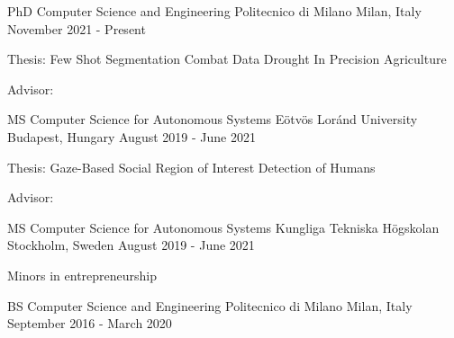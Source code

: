 

\begin{cventries}

  \cventry
    {PhD Computer Science and Engineering } %
    {Politecnico di Milano} %
    {Milan, Italy} %
    {November 2021 - Present} %
    {
      \begin{cvitems} %
        \item {Thesis: Few Shot Segmentation Combat Data Drought In Precision Agriculture}
        \item {Advisor: }
      \end{cvitems}
    }
  \cventry
    {MS Computer Science for Autonomous Systems} %
    {Eötvös Loránd University} %
    {Budapest, Hungary} %
    {August 2019 - June 2021} %
    {
      \begin{cvitems} %
        \item {Thesis: Gaze-Based Social Region of Interest Detection of Humans}
        \item {Advisor: }
      \end{cvitems}
    }

  \cventry
    {MS Computer Science for Autonomous Systems} %
    {Kungliga Tekniska Högskolan} %
    {Stockholm, Sweden} %
    {August 2019 - June 2021} %
    { 
      \begin{cvitems}
        \item {Minors in entrepreneurship}
      \end{cvitems}
    }

  \cventry
    {BS Computer Science and Engineering} %
    {Politecnico di Milano} %
    {Milan, Italy} %
    {September 2016 - March 2020} %
    { }

\end{cventries}
